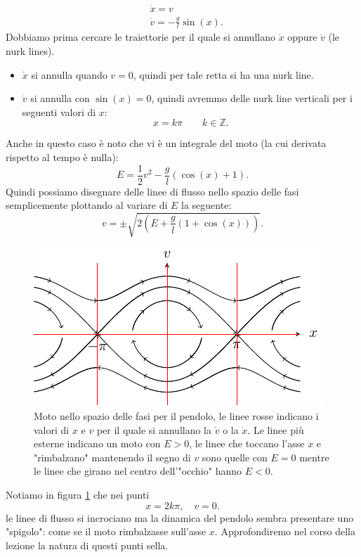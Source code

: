 \noindent
\begin{exmp}[Pendolo]
    \[\begin{aligned}
	& \dot{x}=v\\
	& \dot{v}=-\frac{g}{l}\sin (x) 
    .\end{aligned}\]
    Dobbiamo prima cercare le traiettorie per il quale si annullano $\dot{x}$ oppure $\dot{v}$ (le nurk lines). 
    \begin{itemize}
        \item $\dot{x}$ si annulla quando $v = 0$, quindi per tale retta si ha una nurk line.
	\item $\dot{v}$ si annulla con $\sin (x) = 0$, quindi avremmo delle nurk line verticali per i seguenti valori di $x$: 
	    \[
		x = k\pi  \qquad k \in \mathbb{Z}
	    .\] 
    \end{itemize}
    Anche in questo caso è noto che vi è un integrale del moto (la cui derivata rispetto al tempo è nulla): 
    \[
	E = \frac{1}{2}v^2 - \frac{g}{l}\left(\cos (x) + 1\right)
    .\] 
    Quindi possiamo disegnare delle linee di flusso nello spazio delle fasi semplicemente plottando al variare di $E$  la seguente:
    \[
	v = \pm \sqrt{2 \left( E + \frac{g}{l}(1 + \cos (x)) \right) } 
    .\] 
    \begin{figure}[H]
        \centering
        \includegraphics[width=0.8\columnwidth]{lezioni/tikz/lez_15_pendolo.pdf}
    \caption{\scriptsize Moto nello spazio delle fasi per il pendolo, le linee rosse indicano i valori di $x$ e $v$ per il quale si annullano la $\dot{v}$ o la $\dot{x}$. Le linee più esterne indicano un moto con $E > 0$, le linee che toccano l'asse $x$ e "rimbalzano" mantenendo il segno di $v$ sono quelle con $E = 0$ mentre le linee che girano nel centro dell'"occhio" hanno $E < 0$.}
    \label{fig:15_pendolo}
    \end{figure}
%    
    Notiamo in figura \ref{fig:15_pendolo} che nei punti 
    \[
        x = 2k\pi, \quad v = 0
    .\] 
    le linee di flusso si incrociano ma la dinamica del pendolo sembra presentare uno "spigolo": come se il moto rimbalzasse sull'asse $x$. Approfondiremo nel corso della lezione la natura di questi punti sella.
\end{exmp}
